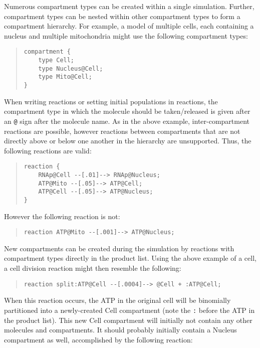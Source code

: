 \documentclass[10pt]{article}
\newcommand{\code}[1]{{\tt {#1}}}
\begin{document}
Numerous compartment types can be created within a single simulation. Further, compartment types can be nested within other compartment types to form a compartment hierarchy. For example, a model of multiple cells, each containing a nucleus and multiple mitochondria might use the following compartment types:

\begin{quote}
\begin{verbatim}
compartment {
    type Cell;
    type Nucleus@Cell;
    type Mito@Cell;
}
\end{verbatim}
\end{quote}

When writing reactions or setting initial populations in reactions, the compartment type in which the molecule should be taken/released is given after an \code{@} sign after the molecule name. As in the above example, inter-compartment reactions are possible, however reactions between compartments that are not directly above or below one another in the hierarchy are unsupported. Thus, the following reactions are valid:

\begin{quote}
\begin{verbatim}
reaction {
    RNAp@Cell --[.01]--> RNAp@Nucleus;
    ATP@Mito --[.05]--> ATP@Cell;
    ATP@Cell --[.05]--> ATP@Nucleus;
}
\end{verbatim}
\end{quote}

However the following reaction is not:

\begin{quote}
\begin{verbatim}
reaction ATP@Mito --[.001]--> ATP@Nucleus;
\end{verbatim}
\end{quote}

New compartments can be created during the simulation by reactions with compartment types directly in the product list. Using the above example of a cell, a cell division reaction might then resemble the following:

\begin{quote}
\begin{verbatim}
reaction split:ATP@Cell --[.0004]--> @Cell + :ATP@Cell;
\end{verbatim}
\end{quote}

When this reaction occurs, the ATP in the original cell will be binomially partitioned into a newly-created Cell compartment (note the \code{:} before the ATP in the product list). This new Cell compartment will initially not contain any other molecules and compartments. It should probably initially contain a Nucleus compartment as well, accomplished by the following reaction:
\end{document}

